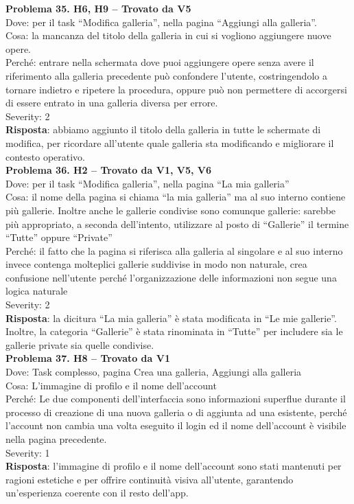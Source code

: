 \documentclass{article}
\begin{document}
\noindent \textbf{Problema 35. H6, H9 – Trovato da V5} \\
Dove: per il task “Modifica galleria”, nella pagina “Aggiungi alla galleria”. \\
Cosa: la mancanza del titolo della galleria in cui si vogliono aggiungere nuove opere. \\
Perché: entrare nella schermata dove puoi aggiungere opere senza avere il riferimento alla galleria precedente può confondere l’utente, costringendolo a tornare indietro e ripetere la procedura, oppure può non permettere di accorgersi di essere entrato in una galleria diversa per errore. \\
Severity: 2 \\
\textbf{Risposta}: abbiamo aggiunto il titolo della galleria in tutte le schermate di modifica, per ricordare all’utente quale galleria sta modificando e migliorare il contesto operativo.\\
\newpage
\noindent \textbf{Problema 36. H2 – Trovato da V1, V5, V6} \\
Dove: per il task “Modifica galleria”, nella pagina “La mia galleria” \\
Cosa: il nome della pagina si chiama “la mia galleria” ma al suo interno contiene più gallerie. Inoltre anche le gallerie condivise sono comunque gallerie: sarebbe più appropriato, a seconda dell’intento, utilizzare al posto di “Gallerie” il termine “Tutte” oppure “Private” \\
Perché: il fatto che la pagina si riferisca alla galleria al singolare e al suo interno invece contenga molteplici gallerie suddivise in modo non naturale, crea confusione nell’utente perché l’organizzazione delle informazioni non segue una logica naturale \\
Severity: 2 \\
\textbf{Risposta}: la dicitura “La mia galleria” è stata modificata in “Le mie gallerie”. Inoltre, la categoria “Gallerie” è stata rinominata in “Tutte” per includere sia le gallerie private sia quelle condivise.\\

\noindent \textbf{Problema 37. H8 – Trovato da V1} \\
Dove: Task complesso, pagina Crea una galleria, Aggiungi alla galleria \\
Cosa: L’immagine di profilo e il nome dell’account \\
Perché: Le due componenti dell’interfaccia sono informazioni superflue durante il processo di creazione di una nuova galleria o di aggiunta ad una esistente, perché l’account non cambia una volta eseguito il login ed il nome dell'account è visibile nella pagina precedente. \\
Severity: 1 \\
\textbf{Risposta}: l’immagine di profilo e il nome dell’account sono stati mantenuti per ragioni estetiche e per offrire continuità visiva all’utente, garantendo un’esperienza coerente con il resto dell’app.\\
\end{document}
